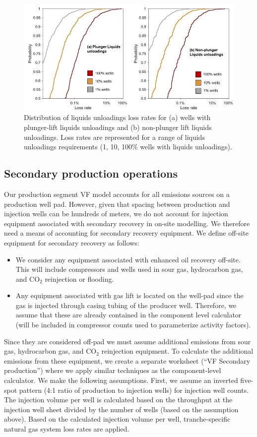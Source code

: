\documentclass[11pt]{report}
\begin{document}
 \begin{figure}[t]
\includegraphics[width=1\columnwidth]{images/LU_dists.jpg}
\caption{Distribution of liquids unloadings loss rates for (a) wells with plunger-lift liquids unloadings and (b) non-plunger lift liquids unloadings. Loss rates are represented for a range of liquids unloadings requirements (1, 10, 100\% wells with liquids unloadings). }
\label{fig:LU_dists}
\end{figure}  

\subsection{Secondary production operations}
Our production segment VF model accounts for all emissions sources on a production well pad. However, given that spacing between production and injection wells can be hundreds of meters, we do not account for injection equipment associated with secondary recovery in on-site modelling. We therefore need a means of accounting for secondary recovery equipment. We define off-site equipment for secondary recovery as follows:
\begin{itemize}
\item	We consider any equipment associated with enhanced oil recovery off-site. This will include compressors and wells used in sour gas, hydrocarbon gas, and CO$_2$ reinjection or flooding. 
\item	Any equipment associated with gas lift is located on the well-pad since the gas is injected through casing tubing of the producer well. Therefore, we assume that these are already contained in the component level calculator (will be included in compressor counts used to parameterize activity factors). 
\end{itemize}

Since they are considered off-pad we must assume additional emissions from sour gas, hydrocarbon gas, and CO$_2$ reinjection equipment. To calculate the additional emissions from these equipment, we create a separate worksheet (``VF Secondary production'') where we apply similar techniques as the component-level calculator. We make the following assumptions. First, we assume an inverted five-spot pattern (4:1 ratio of production to injection wells) for injection well counts. The injection volume per well is calculated based on the throughput at the injection well sheet divided by the number of wells (based on the assumption above). Based on the calculated injection volume per well, tranche-specific natural gas system loss rates are applied.
\end{document}

